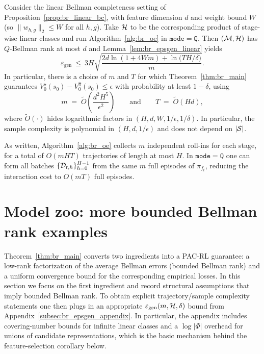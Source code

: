 \begin{corollary}
\label{cor:br_linear_bc_inst}
Consider the linear Bellman completeness setting of Proposition~\ref{prop:br_linear_bc}, with feature
dimension $d$ and weight bound $W$ (so $\|w_{h,g}\|_2\le W$ for all $h,g$).
Take $\mathcal{H}$ to be the corresponding product of stage-wise linear classes and run
Algorithm~\ref{alg:br_oe} in $\mathtt{mode}=\mathtt{Q}$.
Then $(\mathcal{M},\mathcal{H})$ has $Q$-Bellman rank at most $d$ and Lemma~\ref{lem:br_epsgen_linear} yields
\[
\varepsilon_{\mathrm{gen}}
\ \le\
3H\sqrt{\frac{2d\ln(1+4Wm)+\ln\!\big(TH/\delta\big)}{m}}.
\]
In particular, there is a choice of $m$ and $T$ for which Theorem~\ref{thm:br_main} guarantees
$V_0^\star(s_0)-V_0^{\hat\pi}(s_0)\le \epsilon$ with probability at least $1-\delta$, using
\[
m \;=\; \widetilde O\!\left(\frac{d^2 H^5}{\epsilon^2}\right)
\qquad\text{and}\qquad
T \;=\; \widetilde O(Hd),
\]
where $\widetilde O(\cdot)$ hides logarithmic factors in $(H,d,W,1/\epsilon,1/\delta)$.
In particular, the sample complexity is polynomial in $(H,d,1/\epsilon)$ and does not depend on $|\mathcal{S}|$.
\end{corollary}

As written, Algorithm~\ref{alg:br_oe} collects $m$ independent roll-ins for each stage, for a total of
$O(mHT)$ trajectories of length at most $H$.
In $\mathtt{mode}=\mathtt{Q}$ one can form all batches $\{\mathcal{D}_{t,h}\}_{h=0}^{H-1}$ from the same $m$
full episodes of $\pi_{f_t}$, reducing the interaction cost to $O(mT)$ full episodes.

\section{Model zoo: more bounded Bellman rank examples}
\label{sec:br_model_zoo}

Theorem~\ref{thm:br_main} converts two ingredients into a PAC-RL guarantee: a low-rank factorization
of the average Bellman errors (bounded Bellman rank) and a uniform convergence bound for the
corresponding empirical losses.  In this section we focus on the first ingredient and record
structural assumptions that imply bounded Bellman rank.  To obtain explicit trajectory/sample
complexity statements one then plugs in an appropriate
$\varepsilon_{\mathrm{gen}}(m,\mathcal{H},\delta)$ bound from
Appendix~\ref{subsec:br_epsgen_appendix}.  In particular, the appendix includes covering-number
bounds for infinite linear classes and a $\log|\Phi|$ overhead for unions of candidate
representations, which is the basic mechanism behind the feature-selection corollary below.


